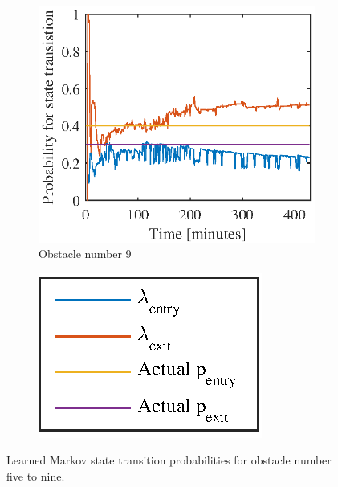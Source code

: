 \begin{figure}[htbp]
	\begin{subfigure}[t]{0.5\linewidth}
		\centering
		\includegraphics[width=1\linewidth]{chapters/appendix/figures/learning_curves/obs9}
		\caption{Obstacle number 9}
	\end{subfigure}
	\hspace*{\fill}
	\begin{subfigure}[t]{0.5\linewidth}
		\centering
		\includegraphics[scale = 1]{chapters/appendix/figures/learning_curves/legend}
	\end{subfigure}

	\caption{Learned Markov state transition probabilities for obstacle number five to nine.}
	\label{fig:all_learnings_sim_2}
\end{figure}

